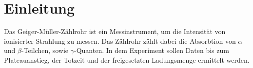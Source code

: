 \section{Einleitung}
Das Geiger-Müller-Zählrohr ist ein Messinstrument, um die Intensität von ionisierter Strahlung zu messen.
Das Zählrohr zählt dabei die Absorbtion von $\alpha$- und $\beta$-Teilchen, sowie $\gamma$-Quanten.
In dem Experiment sollen Daten bis zum Plateauanstieg, der Totzeit und der freigesetzten Ladungsmenge ermittelt werden.
\label{sec:Einleitung}